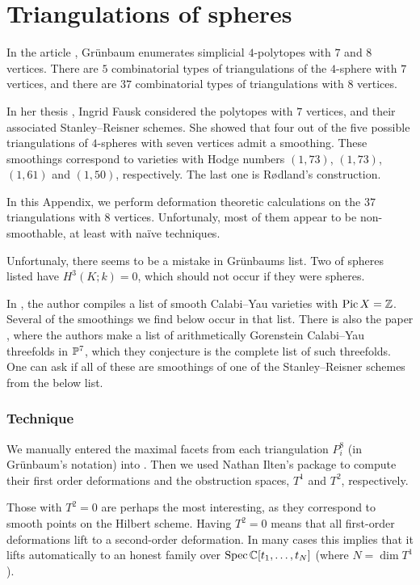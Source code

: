 \chapter{Triangulations of spheres}
\label{sec:spheres8}

In the article \cite{grunbaum_enumeration}, Grünbaum enumerates simplicial $4$-polytopes with $7$ and $8$ vertices. There are $5$ combinatorial types of triangulations of the $4$-sphere with $7$ vertices, and there are $37$ combinatorial types of triangulations with $8$ vertices.

In her thesis \cite{fausk_thesis}, Ingrid Fausk considered the polytopes with $7$ vertices, and their associated Stanley--Reisner schemes. She showed that four out of the five possible triangulations of $4$-spheres with seven vertices admit a smoothing. These smoothings correspond to \CY varieties with Hodge numbers $(1,73)$, $(1,73)$, $(1,61)$ and $(1,50)$, respectively. The last one is Rødland's construction.

In this Appendix, we perform deformation theoretic calculations on the $37$ triangulations with $8$ vertices. Unfortunaly, most of them appear to be non-smoothable, at least with naïve techniques.

Unfortunaly, there seems to be a mistake in Grünbaums list. Two of spheres listed have $H^3(K;k)=0$, which should not occur if they were spheres.

In \cite{kapustka_delpezzo}, the author compiles a list of smooth Calabi--Yau varieties with $\Pic X = \Z$. Several of the smoothings we find below occur in that list. There is also the paper \cite{MR3591944}, where the authors make a list of arithmetically Gorenstein Calabi--Yau threefolds in $\P^7$, which they conjecture is the complete list of such threefolds. One can ask if all of these are smoothings of one of the Stanley--Reisner schemes from the below list.

\subsection{Technique}

We manually entered the maximal facets from each triangulation $P_i^8$ (in Grünbaum's notation) into \MM. Then we used Nathan Ilten's package \cite{ilten_versaldeformations} to compute their first order deformations and the obstruction spaces, $T^1$ and $T^2$, respectively.

Those with $T^2=0$ are perhaps the most interesting, as they correspond to smooth points on the Hilbert scheme. Having $T^2=0$ means that all first-order deformations lift to a second-order deformation. In many cases this implies that it lifts automatically to an honest family over $\Spec \C[t_1,\ldots,t_N]$ (where $N=\dim T^1$).

